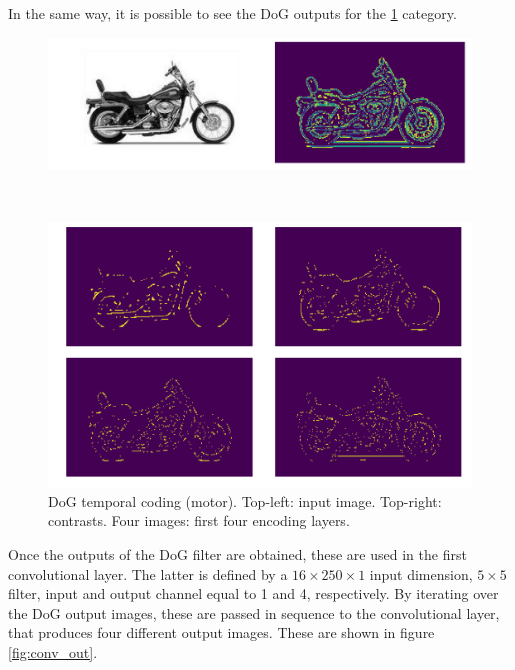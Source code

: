 \documentclass[11pt,a4paper]{scrartcl}
\begin{document}
In the same way, it is possible to see the DoG outputs for the \ref{fig:motor} category.\\
\begin{figure}[h]
	\centering
	\begin{minipage}[b]{\textwidth}
		\includegraphics[width=\textwidth]{images/motor_temp}
	\end{minipage}
	\\
	\begin{minipage}[b]{\textwidth}
		\includegraphics[width=\textwidth]{images/motor_dog_out}
	\end{minipage}
	\caption{DoG temporal coding (motor). Top-left: input image. Top-right: contrasts. Four images: first four encoding layers.}
	\label{fig:motor}
\end{figure}
Once the outputs of the DoG filter are obtained, these are used in the first convolutional layer. The latter is defined by a $ 16\times250\times1 $ input dimension, $ 5\times5 $ filter,  input and output channel equal to 1 and 4, respectively.
By iterating over the DoG output images, these are passed in sequence to the convolutional layer, that produces four different output images. These are shown in figure \ref{fig:conv_out}. 
\end{document}
